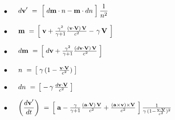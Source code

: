 \documentclass[10pt,fleqn]{article}
\begin{document}
\par \vspace{+2.07em}

\noindent $\bullet$
$
\hspace{+1.20em} {d\mathbf{v}}' ~=~ \Big [ \; d\mathbf{m} \cdot n - \mathbf{m} \cdot dn \; \Big ] \: \dfrac{1}{n^2}
$

\par \vspace{+2.07em}

\noindent $\bullet$
$
\hspace{+1.20em} \mathbf{m} ~=~ \hspace{-0.18em} \left [ \; \mathbf{v} + \frac{\gamma^2}{\gamma + 1} \frac{( \mathbf{v} \cdot \mathbf{V} ) \, \mathbf{V}}{c^2} - \hspace{+0.114em} \gamma \, \mathbf{V} \hspace{+0.114em} \; \right ]
$

\par \vspace{+2.07em}

\noindent $\bullet$
$
\hspace{+1.20em} d\mathbf{m} ~=~ \hspace{-0.18em} \left [ \; d\mathbf{v} + \frac{\gamma^2}{\gamma + 1} \frac{( d\mathbf{v} \cdot \mathbf{V} ) \, \mathbf{V}}{c^2} \; \right ]
$

\par \vspace{+2.07em}

\noindent $\bullet$
$
\hspace{+1.20em} n ~=~ \hspace{-0.18em} \left [ \; \gamma \, ( 1 - \frac{\mathbf{v} \cdot \mathbf{V}}{c^2} ) \; \right ]
$

\par \vspace{+2.07em}

\noindent $\bullet$
$
\hspace{+1.20em} dn ~=~ \hspace{-0.18em} \left [ \; - \, \gamma \, \frac{d\mathbf{v} \cdot \mathbf{V}}{c^2} \; \right ]
$

\par \vspace{+2.07em}

\noindent $\bullet$
$
\hspace{+1.20em} \left ( \dfrac{{d\mathbf{v}}'}{dt} \right ) ~=~ \hspace{-0.18em} \left [ \; \mathbf{a} - \frac{\gamma}{\gamma + 1} \frac{( \mathbf{a} \cdot \mathbf{V} ) \, \mathbf{V}}{c^2} + \frac{( \mathbf{a} \times \mathbf{v} ) \times \mathbf{V}}{c^2} \; \right ] \frac{1}{\gamma \, ( 1 - \frac{\mathbf{v} \cdot \mathbf{V}}{c^2} )^2}
$
\end{document}
